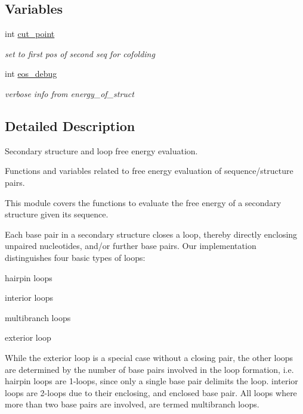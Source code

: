 \subsection*{Variables}
\begin{DoxyCompactItemize}
\item 
int \hyperlink{group__eval_gab9b2c3a37a5516614c06d0ab54b97cda}{cut\+\_\+point}\hypertarget{group__eval_gab9b2c3a37a5516614c06d0ab54b97cda}{}\label{group__eval_gab9b2c3a37a5516614c06d0ab54b97cda}

\begin{DoxyCompactList}\small\item\em set to first pos of second seq for cofolding \end{DoxyCompactList}\item 
int \hyperlink{group__eval_ga567530678f6260a1a649a5beca5da4c5}{eos\+\_\+debug}\hypertarget{group__eval_ga567530678f6260a1a649a5beca5da4c5}{}\label{group__eval_ga567530678f6260a1a649a5beca5da4c5}

\begin{DoxyCompactList}\small\item\em verbose info from energy\+\_\+of\+\_\+struct \end{DoxyCompactList}\end{DoxyCompactItemize}


\subsection{Detailed Description}
Secondary structure and loop free energy evaluation. 

Functions and variables related to free energy evaluation of sequence/structure pairs.

This module covers the functions to evaluate the free energy of a secondary structure given its sequence.

Each base pair in a secondary structure closes a loop, thereby directly enclosing unpaired nucleotides, and/or further base pairs. Our implementation distinguishes four basic types of loops\+:


\begin{DoxyItemize}
\item hairpin loops
\item interior loops
\item multibranch loops
\item exterior loop
\end{DoxyItemize}

While the exterior loop is a special case without a closing pair, the other loops are determined by the number of base pairs involved in the loop formation, i.\+e. hairpin loops are 1-\/loops, since only a single base pair delimits the loop. interior loops are 2-\/loops due to their enclosing, and enclosed base pair. All loops where more than two base pairs are involved, are termed multibranch loops.

